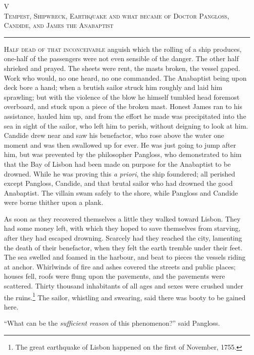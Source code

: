 \begin{center}
V\\
\textsc{Tempest, Shipwreck, Earthquake and what became of Doctor Pangloss, Candide, and James the Anabaptist}
\end{center}
\vspace{-0.5cm}
\rule{\textwidth}{0.5pt}
\lettrine{H}{alf dead of that inconceivable} anguish which the rolling of a ship produces, one-half of the passengers were not even sensible of the danger. The other half shrieked and prayed. The sheets were rent, the masts broken, the vessel gaped. Work who would, no one heard, no one commanded. The Anabaptist being upon deck bore a hand; when a brutish sailor struck him roughly and laid him sprawling; but with the violence of the blow he himself tumbled head foremost overboard, and stuck upon a piece of the broken mast. Honest James ran to his assistance, hauled him up, and from the effort he made was precipitated into the sea in sight of the sailor, who left him to perish, without deigning to look at him. Candide drew near and saw his benefactor, who rose above the water one moment and was then swallowed up for ever. He was just going to jump after him, but was prevented by the philosopher Pangloss, who demonstrated to him that the Bay of Lisbon had been made on purpose for the Anabaptist to be drowned. While he was proving this \textit{a priori}, the ship foundered; all perished except Pangloss, Candide, and that brutal sailor who had drowned the good Anabaptist. The villain swam safely to the shore, while Pangloss and Candide were borne thither upon a plank.

As soon as they recovered themselves a little they walked toward Lisbon. They had some money left, with which they hoped to save themselves from starving, after they had escaped drowning. Scarcely had they reached the city, lamenting the death of their benefactor, when they felt the earth tremble under their feet. The sea swelled and foamed in the harbour, and beat to pieces the vessels riding at anchor. Whirlwinds of fire and ashes covered the streets and public places; houses fell, roofs were flung upon the pavements, and the pavements were scattered. Thirty thousand inhabitants of all ages and sexes were crushed under the ruins.\footnote{The great earthquake of Lisbon happened on the first of November, 1755.} The sailor, whistling and swearing, said there was booty to be gained here.

``What can be the \textit{sufficient reason} of this phenomenon?'' said Pangloss.

